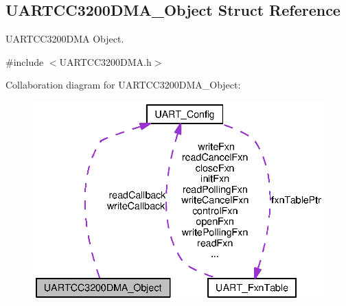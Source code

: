 \subsection{U\-A\-R\-T\-C\-C3200\-D\-M\-A\-\_\-\-Object Struct Reference}
\label{struct_u_a_r_t_c_c3200_d_m_a___object}


U\-A\-R\-T\-C\-C3200\-D\-M\-A Object.  




{\ttfamily \#include $<$U\-A\-R\-T\-C\-C3200\-D\-M\-A.\-h$>$}



Collaboration diagram for U\-A\-R\-T\-C\-C3200\-D\-M\-A\-\_\-\-Object\-:
\nopagebreak
\begin{figure}[H]
\begin{center}
\leavevmode
\includegraphics[width=333pt]{struct_u_a_r_t_c_c3200_d_m_a___object__coll__graph}
\end{center}
\end{figure}
